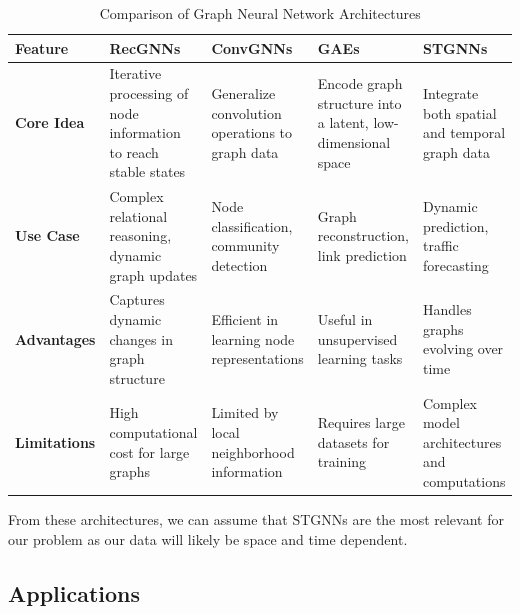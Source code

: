 \documentclass[10pt]{article}
\begin{document}
    \begin{table}[h]
        \centering
        \begin{tabularx}{\textwidth}{|X|X|X|X|X|}
            \hline
            \textbf{Feature}     & \textbf{RecGNNs}                                                & \textbf{ConvGNNs}                               & \textbf{GAEs}                                               & \textbf{STGNNs}                                \\ \hline
            \textbf{Core Idea}   & Iterative processing of node information to reach stable states      & Generalize convolution operations to graph data   & Encode graph structure into a latent, low-dimensional space   & Integrate both spatial and temporal graph data    \\ \hline
            \textbf{Use Case}    & Complex relational reasoning, dynamic graph updates             & Node classification, community detection          & Graph reconstruction, link prediction                         & Dynamic prediction, traffic forecasting           \\ \hline
            \textbf{Advantages}  & Captures dynamic changes in graph structure                     & Efficient in learning node representations        & Useful in unsupervised learning tasks                         & Handles graphs evolving over time                 \\ \hline
            \textbf{Limitations} & High computational cost for large graphs                        & Limited by local neighborhood information         & Requires large datasets for training                          & Complex model architectures and computations      \\ \hline
        \end{tabularx}
        \caption{Comparison of Graph Neural Network Architectures}
        \label{tab:gnn_comparison}
    \end{table}


    From these architectures, we can assume that STGNNs are the most relevant for our problem as our data will likely be space and time dependent.

    \subsection{Applications}\label{subsec:applications}
\end{document}
